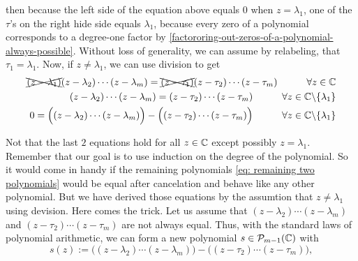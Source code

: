 \begin{prf}
  then because the left side of the equation above equals $0$ when $z=\lambda_1$, one of the $\tau$'s on the right hide side equals $\lambda_1$, because every zero of a polynomial corresponds to a degree-one factor by \ref{factororing-out-zeros-of-a-polynomial-always-possible}. Without loss of generality, we can assume by relabeling, that $\tau_1 = \lambda_1$. Now, if $z \neq \lambda_1$, we can use division to get
  \begin{align}
    \xcancel{(z - \lambda_1)} (z - \lambda_2) \cdots (z-\lambda_m) = \xcancel{(z-\tau_1)} (z-\tau_2) \cdots (z-\tau_m) \quad \qquad \forall z \in \mathbb{C} \nonumber \\
    (z - \lambda_2) \cdots (z-\lambda_m) = (z-\tau_2) \cdots (z-\tau_m) \quad \qquad  \forall z \in \mathbb{C} \backslash \{ \lambda_1 \} \label{eq: remaining two polynomials} \\
    0 = \Big((z - \lambda_2) \cdots (z-\lambda_m) \Big) -   \Big((z-\tau_2) \cdots (z-\tau_m)\Big) \quad \qquad \forall z \in \mathbb{C} \backslash \{ \lambda_1 \} \label{eq: last equation}
  \end{align}

  Not that the last $2$ equations hold for all $z \in \mathbb{C}$ except possibly $z = \lambda_1$. Remember that our goal is to use induction on the degree of the polynomial. So it would come in handy if the remaining polynomials \eqref{eq: remaining two polynomials} would be equal after cancelation and behave like any other polynomial. But we have derived those equations by the assumtion that $z \neq \lambda_1$ using devision. Here comes the trick. Let us assume that $(z - \lambda_2) \cdots (z-\lambda_m)$ and $(z - \tau_2) \cdots (z-\tau_m)$ are not always equal. Thus, with the standard laws of polynomial arithmetic, we can form a new polynomial $s \in \mathcal{P}_{m-1}(\mathbb{C})$ with
  \begin{equation}
    s(z) :=   \Big((z - \lambda_2) \cdots (z-\lambda_m)\Big) - \Big((z-\tau_2) \cdots (z-\tau_m)\Big),
  \end{equation}


\end{prf}
